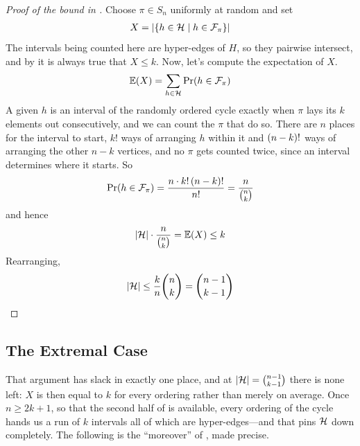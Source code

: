 \begin{proof}[Proof of the bound in ]
    Choose $\pi \in S_n$ uniformly at random and set
    \begin{align*}
        X = \left\lvert \left\{ h \in \mathcal{H} \; \middle\vert \; h \in \mathcal{F}_{\pi} \right\} \right\rvert
    \end{align*}
    The intervals being counted here are hyper-edges of $H$, so they pairwise intersect, and by  it is always true that $X \leq k$. Now, let's compute the expectation of $X$.
    \begin{align*}
        \mathbb{E}\!\left( X \right) = \sum_{h \in \mathcal{H}} \Pr\!\left( h \in \mathcal{F}_{\pi} \right)
    \end{align*}
    A given $h$ is an interval of the randomly ordered cycle exactly when $\pi$ lays its $k$ elements out consecutively, and we can count the $\pi$ that do so. There are $n$ places for the interval to start, $k!$ ways of arranging $h$ within it and $\left( n - k \right)!$ ways of arranging the other $n - k$ vertices, and no $\pi$ gets counted twice, since an interval determines where it starts. So
    \begin{align*}
        \Pr\!\left( h \in \mathcal{F}_{\pi} \right) = \frac{n \cdot k! \left( n - k \right)!}{n!} = \frac{n}{\binom{n}{k}}
    \end{align*}
    and hence
    \begin{align*}
        \left\lvert \mathcal{H} \right\rvert \cdot \frac{n}{\binom{n}{k}} = \mathbb{E}\!\left( X \right) \leq k
    \end{align*}
    Rearranging,
    \begin{align*}
        \left\lvert \mathcal{H} \right\rvert \leq \frac{k}{n} \binom{n}{k} = \binom{n-1}{k-1}
    \end{align*}
\end{proof}

\subsection{The Extremal Case}

That argument has slack in exactly one place, and at $\left\lvert \mathcal{H} \right\rvert = \binom{n-1}{k-1}$ there is none left: $X$ is then equal to $k$ for every ordering rather than merely on average. Once $n \geq 2k + 1$, so that the second half of  is available, every ordering of the cycle hands us a run of $k$ intervals all of which are hyper-edges---and that pins $\mathcal{H}$ down completely. The following is the ``moreover'' of , made precise.


